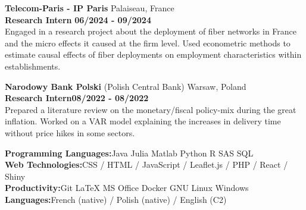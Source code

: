     \vspace{0.15cm}
    \noindent\textbf{Telecom-Paris - IP Paris} \hfill Palaiseau, France\\[0.1cm]
    \textbf{Research Intern} \hfill \textbf{06/2024  - 09/2024} \\
	Engaged in a research project about the deployment of fiber networks in France and the micro effects it caused at the firm level. Used econometric methods to estimate causal effects of fiber deployments on employment characteristics within establishments.

    \vspace{0.15cm}
    
    \noindent\textbf{Narodowy Bank Polski} (Polish Central Bank) \hfill Warsaw, Poland\\[0.1cm]
    \textbf{Research Intern}\hfill \textbf{08/2022  - 08/2022} \\
    Prepared a literature review on the monetary/fiscal policy-mix during the great inflation. Worked on a VAR model explaining the increases in delivery time without price hikes in some sectors. 

\begin{flushleft}
\raisebox{-.6ex}{SKILLS} \hrulefill
\end{flushleft}

    \noindent\textbf{Programming Languages:}\hfill{Java \tbar Julia \tbar Matlab \tbar Python \tbar R \tbar SAS \tbar SQL} \\
    \textbf{Web Technologies:}\hfill CSS / HTML / JavaScript / Leaflet.js / PHP / React / Shiny \\
    \textbf{Productivity:}\hfill Git \tbar LaTeX \tbar MS Office \tbar Docker \tbar GNU Linux \tbar Windows \\
    \textbf{Languages:}\hfill French (native) / Polish (native) / English (C2)
